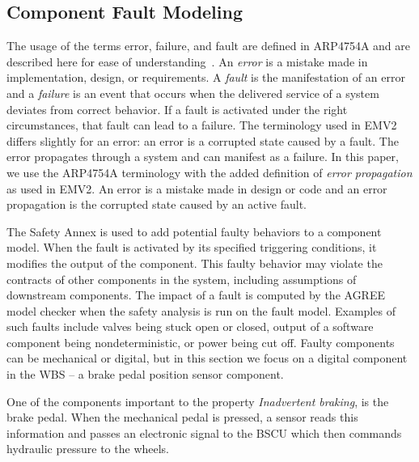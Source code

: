 \subsection{Component Fault Modeling}

The usage of the terms error, failure, and fault are defined in ARP4754A and are described here for ease of understanding~\cite{SAE:ARP4754A}. An \textit{error} is a mistake made in implementation, design, or requirements. A \textit{fault} is the manifestation of an error and a \textit{failure} is an event that occurs when the delivered service of a system deviates from correct behavior. If a fault is activated under the right circumstances, that fault can lead to a failure. The terminology used in EMV2 differs slightly for an error: an error is a corrupted state caused by a fault. The error propagates through a system and can  manifest as a failure. In this paper, we use the ARP4754A terminology with the added definition of \textit{error propagation} as used in EMV2. An error is a mistake made in design or code and an error propagation is the corrupted state caused by an active fault. 

The Safety Annex is used to add potential faulty behaviors to a component model.  When the fault is activated by its specified triggering conditions, it modifies the output of the component. This faulty behavior may violate the contracts of other components in the system, including assumptions of downstream components. The impact of a fault is computed by the AGREE model checker when the safety analysis is run on the fault model. Examples of such faults include valves being stuck open or closed, output of a software component being nondeterministic, or power being cut off. Faulty components can be mechanical or digital, but in this section we focus on a digital component in the WBS -- a brake pedal position sensor component. 

One of the components important to the property \textit{Inadvertent braking}, is the brake pedal. When the mechanical pedal is pressed, a sensor reads this information and passes an electronic signal to the BSCU which then commands hydraulic pressure to the wheels. 

